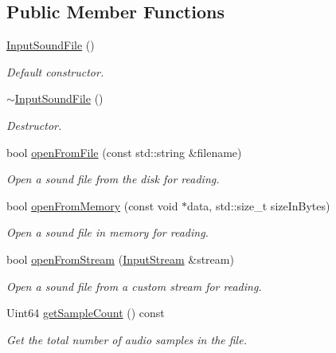 \subsection*{Public Member Functions}
\begin{DoxyCompactItemize}
\item 
\mbox{\hyperlink{classsf_1_1_input_sound_file_a3b95347de25d1d93a3230287cf47a077}{Input\+Sound\+File}} ()
\begin{DoxyCompactList}\small\item\em Default constructor. \end{DoxyCompactList}\item 
\mbox{\hyperlink{classsf_1_1_input_sound_file_a326a1a486587038123de0c187bf5c635}{$\sim$\+Input\+Sound\+File}} ()
\begin{DoxyCompactList}\small\item\em Destructor. \end{DoxyCompactList}\item 
bool \mbox{\hyperlink{classsf_1_1_input_sound_file_af68e54bc9bfac19554c84601156fe93f}{open\+From\+File}} (const std\+::string \&filename)
\begin{DoxyCompactList}\small\item\em Open a sound file from the disk for reading. \end{DoxyCompactList}\item 
bool \mbox{\hyperlink{classsf_1_1_input_sound_file_a4e034a8e9e69ca3c33a3f11180250400}{open\+From\+Memory}} (const void $\ast$data, std\+::size\+\_\+t size\+In\+Bytes)
\begin{DoxyCompactList}\small\item\em Open a sound file in memory for reading. \end{DoxyCompactList}\item 
bool \mbox{\hyperlink{classsf_1_1_input_sound_file_a32b76497aeb088a2b46dc6efd819b909}{open\+From\+Stream}} (\mbox{\hyperlink{classsf_1_1_input_stream}{Input\+Stream}} \&stream)
\begin{DoxyCompactList}\small\item\em Open a sound file from a custom stream for reading. \end{DoxyCompactList}\item 
Uint64 \mbox{\hyperlink{classsf_1_1_input_sound_file_a665b7fed6cdca3e0c622909e5a6655e4}{get\+Sample\+Count}} () const
\begin{DoxyCompactList}\small\item\em Get the total number of audio samples in the file. \end{DoxyCompactList}\item 

\end{DoxyCompactItemize}

